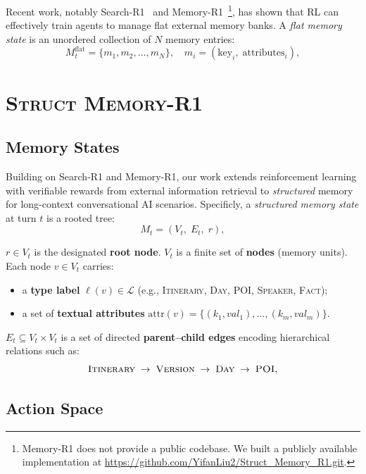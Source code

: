 \documentclass{article}
\theoremstyle{definition}
\begin{document}
Recent work, notably Search-R1~\citep{jin2025search}  and Memory-R1~\citep{yan2025memory}\footnote{Memory-R1 does not provide a public codebase. We built a publicly available implementation at \url{https://github.com/YifanLiu2/Struct_Memory_R1.git}.}, has shown that RL can effectively train agents to manage flat external memory banks.
A \emph{flat memory state} is an unordered collection of $N$ memory entries:
\begin{equation}
M_t^{\text{flat}} = \{m_1, m_2, \ldots, m_N\}, \quad m_i = (\text{key}_i,\; \text{attributes}_i),
\end{equation}


\section{\textsc{Struct Memory-R1}}

\subsection{Memory States}
Building on Search-R1 and Memory-R1, our work extends reinforcement learning with verifiable rewards from external information retrieval to \emph{structured} memory for long-context conversational AI scenarios.
Specificly, a \emph{structured memory state} at turn $t$ is a rooted tree:
\begin{equation}
M_t = (V_t,\; E_t,\; r),
\end{equation}

$r \in V_t$ is the designated \textbf{root node}.
$V_t$ is a finite set of \textbf{nodes} (memory units). Each node $v \in V_t$ carries:
    \begin{itemize}[nosep]
        \item a \textbf{type label} $\ell(v) \in \mathcal{L}$ (e.g., \textsc{Itinerary}, \textsc{Day}, \textsc{POI}, \textsc{Speaker}, \textsc{Fact});
        \item a set of \textbf{textual attributes} $\text{attr}(v) = \{(k_1, val_1), \ldots, (k_m, val_m)\}$.
    \end{itemize}

 $E_t \subseteq V_t \times V_t$ is a set of directed \textbf{parent--child edges} encoding hierarchical relations such as:
\begin{equation}
\textsc{Itinerary} \;\to\; \textsc{Version} \;\to\; \textsc{Day} \;\to\; \textsc{POI},
\end{equation}


\subsection{Action Space}
\end{document}
